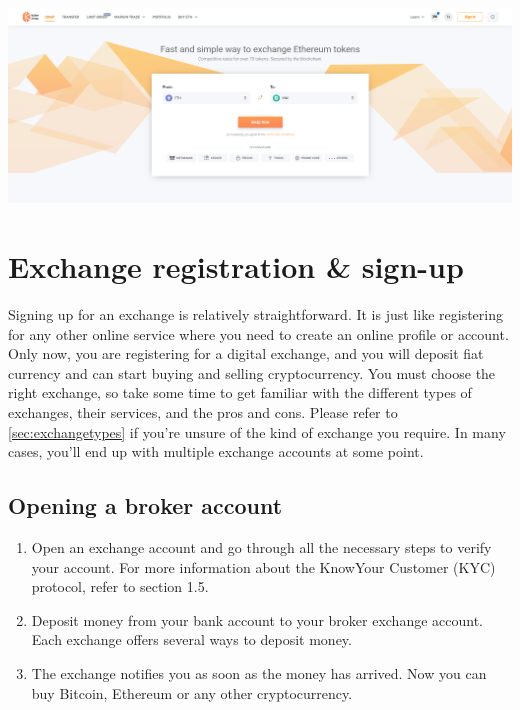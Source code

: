 \medskip
\begin{borderbox}
    \includegraphics[width=\textwidth]{img/ch-exchanges/kyber_swap.png}
\end{borderbox}

\newpage

\section{Exchange registration \& sign-up}
Signing up for an exchange is relatively straightforward. It is just like registering for any other online service where you need to create an online profile or account. Only now, you are registering for a digital exchange, and you will deposit fiat currency and can start buying and selling cryptocurrency. You must choose the right exchange, so take some time to get familiar with the different types of exchanges, their services, and the pros and cons. Please refer to \cref{sec:exchangetypes} if you're unsure of the kind of exchange you require. In many cases, you'll end up with multiple exchange accounts at some point.

\subsection*{Opening a broker account}
\begin{enumerate}

    \item Open an exchange account and go through all the necessary steps to verify your account.  For more information about the KnowYour Customer (KYC) protocol, refer to section 1.5.
    \item Deposit money from your bank account to your broker exchange account.  Each exchange offers several ways to deposit money.
    \item The exchange notifies you as soon as the money has arrived. Now you can buy Bitcoin, Ethereum or any other cryptocurrency.  

 \end{enumerate}

